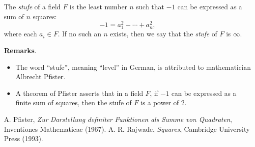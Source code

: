 \documentclass[12pt]{article}
\begin{document}
The \emph{stufe} of a field $F$ is the least number $n$ such that $-1$ can be expressed as a sum of $n$ squares:
$$-1=a_1^2+\cdots+a_n^2,$$
where each $a_i\in F$.  If no such an $n$ exists, then we say that the \emph{stufe} of $F$ is $\infty$.

\textbf{Remarks}.
\begin{itemize}
\item The word ``stufe'', meaning ``level'' in German, is attributed to mathematician Albrecht Pfister.
\item A theorem of Pfister asserts that in a field $F$, if $-1$ can be expressed as a finite sum of squares, then the stufe of $F$ is a power of $2$.
\end{itemize}

\begin{thebibliography}{8}
 A. Pfister, {\em Zur Darstellung definiter Funktionen als Summe von Quadraten}, Inventiones Mathematicae (1967).
 A. R. Rajwade, {\em Squares}, Cambridge University Press (1993).
\end{thebibliography}
\end{document}
